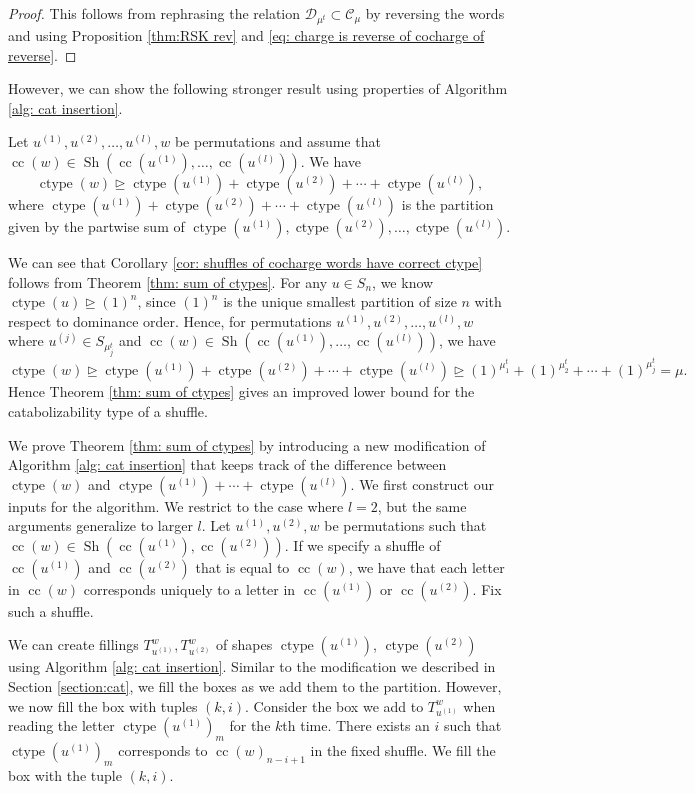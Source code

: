 \documentclass[10pt]{amsart}
\theoremstyle{plain}
\theoremstyle{definition}
\theoremstyle{plain}
\theoremstyle{plain}
\theoremstyle{remark}
\theoremstyle{plain}
\theoremstyle{plain}
\DeclareMathOperator{\ctype}{ctype}
\DeclareMathOperator{\sh}{Sh}
\DeclareMathOperator{\cc}{cc}
\begin{document}
\begin{proof}
This follows from rephrasing the relation $\mathcal{D}_{\mu^t} \subset \mathcal{C}_\mu$ by reversing the words and using Proposition \ref{thm:RSK rev} and \eqref{eq: charge is reverse of cocharge of reverse}.
\end{proof}
However, we can show the following stronger result using properties of Algorithm \ref{alg: cat insertion}.
\begin{thm2}\label{thm: sum of ctypes}
    Let $u^{(1)}, u^{(2)}, \dots, u^{(l)}, w$ be
    permutations and assume that $\cc(w) \in \sh(\cc(u^{(1)}),\dots, \cc(u^{(l)}))$.
    We have
    \[\ctype(w) \unrhd \ctype(u^{(1)}) + \ctype( u^{(2)}) + \cdots+ \ctype(u^{(l)}),\]
    where $\ctype(u^{(1)}) + \ctype( u^{(2)}) + \cdots +  \ctype(u^{(l)})$ is the partition given by the partwise sum of $\ctype(u^{(1)}),\ctype( u^{(2)}),\dots,\ctype(u^{(l)})$.
    \end{thm2}

We can see that Corollary \ref{cor: shuffles of cocharge words have correct ctype} follows from Theorem \ref{thm: sum of ctypes}. 
For any $u \in S_n$, we know $\ctype(u) \unrhd (1)^n$, since $(1)^{n}$ is the unique smallest partition of size $n$ with respect to dominance order. Hence, for permutations  $u^{(1)}, u^{(2)}, \dots, u^{(l)}, w$  where $u^{(j)}  \in S_{\mu^t_j}$ and $\cc(w) \in \sh(\cc(u^{(1)}),\dots, \cc(u^{(l)}))$, we have
\[\ctype(w) \unrhd \ctype(u^{(1)}) + \ctype( u^{(2)}) + \cdots+ \ctype(u^{(l)}) \unrhd (1)^{\mu^t_1} + (1)^{\mu^t_2} + \cdots + (1)^{\mu^t_j } = \mu.\]
Hence Theorem \ref{thm: sum of ctypes} gives an improved lower bound for the catabolizability type of a shuffle. 

We prove Theorem \ref{thm: sum of ctypes} by introducing a new modification of Algorithm \ref{alg: cat insertion} that keeps track of the difference between $\ctype(w)$ and $\ctype(u^{(1)}) +\cdots +\ctype(u^{(l)})$. 
We first construct our inputs for the algorithm. We restrict to the case where $l = 2$, but the same arguments generalize to larger $l.$
Let $u^{(1)}, u^{(2)},w$ be permutations such that $\cc(w)\in \sh(\cc(u^{(1)}),\cc(u^{(2)}))$. 
If we specify a shuffle of $\cc(u^{(1)})$ and $\cc(u^{(2)})$ that is equal to $\cc(w)$, we have that each letter in $\cc(w)$ corresponds uniquely to a letter in $\cc(u^{(1)})$ or $\cc(u^{(2)})$. Fix such a shuffle. 

We can create fillings $T^{w}_{u^{(1)}},T^w_{u^{(2)}}$ of shapes $\ctype(u^{(1)})$, $\ctype(u^{(2)})$ using Algorithm \ref{alg: cat insertion}. 
Similar to the modification we described in Section \ref{section:cat}, we fill the boxes as we add them to the partition. 
However, we now fill the box with tuples $(k,i)$. 
Consider the box we add to $T^{w}_{u^{(1)}}$ when reading the letter $\ctype(u^{(1)})_{m}$ for the $k$th time. There exists an $i$ such that $\ctype(u^{(1)})_{m}$ corresponds to $\cc(w)_{n-i+1}$ in the fixed shuffle. We fill the box with the tuple $(k,i)$. 
\end{document}

